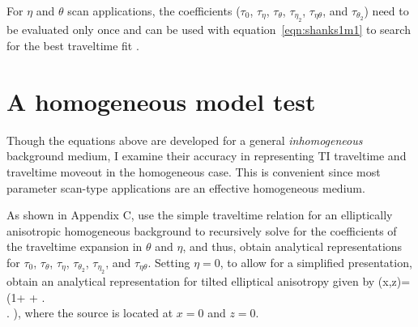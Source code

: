  For $\eta$ and $\theta$ scan
applications, the coefficients ($\tau_{0}$, $\tau_{\eta}$, $\tau_{\theta}$, $\tau_{\eta_2}$, $\tau_{\eta \theta}$, and $\tau_{\theta_2}$) 
need to be evaluated only once and can be used with 
equation~\ref{eqn:shanks1m1} to search for the best traveltime fit
.


\section{A homogeneous model test}

Though the equations above are developed for a general {\emph{inhomogeneous}} background medium, I examine their accuracy in representing
TI traveltime and traveltime moveout in the homogeneous case. This is convenient since most parameter scan-type applications 
are   an effective homogeneous medium.

As shown in Appendix C,   use the simple traveltime relation for an elliptically anisotropic homogeneous background 
 to recursively solve for the 
coefficients of the traveltime expansion in $\theta$ and  $\eta$, and thus, obtain
analytical representations for   $\tau_{0}$, $\tau_{\theta}$,
$\tau_{\eta}$, $\tau_{\theta_2}$, $\tau_{\eta_2}$, and $\tau_{\eta \theta}$. Setting
$\eta=0$,  to allow for a simplified presentation,
   obtain an analytical representation  for tilted elliptical anisotropy given by
\beqa
\tau(x,z)= 
   \left(1+ + \right. \nonumber \\ \left. \right),
\label{eqn:eikeqn2}
\eeqa
where the source is located at $x=0$ and $z=0$.

